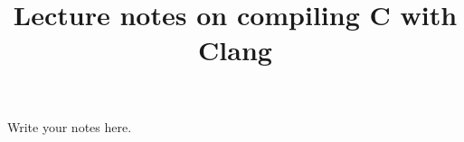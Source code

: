 \documentclass{article}
\title{Lecture notes on compiling C with Clang}
\begin{document}
\maketitle

Write your notes here.
\end{document}

